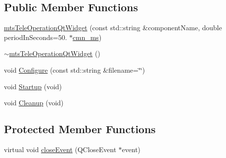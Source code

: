 \subsection*{Public Member Functions}
\begin{DoxyCompactItemize}
\item 
\hyperlink{classmts_tele_operation_qt_widget_a332a9b14cae2e0d3effbfb6e7f89d8fa}{mts\-Tele\-Operation\-Qt\-Widget} (const std\-::string \&component\-Name, double period\-In\-Seconds=50. $\ast$\hyperlink{cmn_units_8h_aaf4d3f2fafb9b4a95606544b9d876b4a}{cmn\-\_\-ms})
\item 
\hyperlink{classmts_tele_operation_qt_widget_af1bb55aa6e057770327bb843491bda8a}{$\sim$mts\-Tele\-Operation\-Qt\-Widget} ()
\item 
void \hyperlink{classmts_tele_operation_qt_widget_abe6f07d439d8b5895da83326a8d6bcf9}{Configure} (const std\-::string \&filename=\char`\"{}\char`\"{})
\item 
void \hyperlink{classmts_tele_operation_qt_widget_a4e5a6ed4858b14d12d6ef7fa3354b1c5}{Startup} (void)
\item 
void \hyperlink{classmts_tele_operation_qt_widget_a9ad149686193c3027e1448082296704a}{Cleanup} (void)
\end{DoxyCompactItemize}
\subsection*{Protected Member Functions}
\begin{DoxyCompactItemize}
\item 
virtual void \hyperlink{classmts_tele_operation_qt_widget_a52c78e296d8af55262774a272aaa07c5}{close\-Event} (Q\-Close\-Event $\ast$event)
\end{DoxyCompactItemize}

